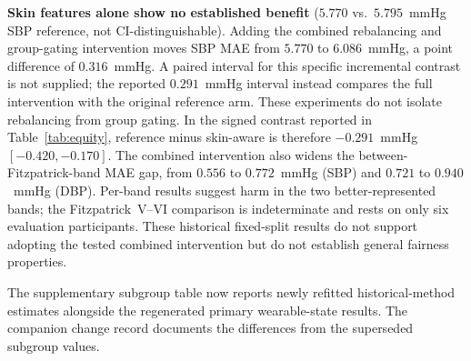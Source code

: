 \documentclass[12pt]{article}
\begin{document}
\textbf{Skin features alone show no established benefit} ($5.770$ vs.\ $5.795$~mmHg SBP reference, not CI-distinguishable). Adding the combined rebalancing and group-gating intervention moves SBP MAE from $5.770$ to $6.086$~mmHg, a point difference of $0.316$~mmHg. A paired interval for this specific incremental contrast is not supplied; the reported $0.291$~mmHg interval instead compares the full intervention with the original reference arm. These experiments do not isolate rebalancing from group gating. In the signed contrast reported in Table~\ref{tab:equity}, reference minus skin-aware is therefore $-0.291$~mmHg $[-0.420,-0.170]$. The combined intervention also widens the between-Fitzpatrick-band MAE gap, from $0.556$ to $0.772$~mmHg (SBP) and $0.721$ to $0.940$~mmHg (DBP). Per-band results suggest harm in the two better-represented bands; the Fitzpatrick~V--VI comparison is indeterminate and rests on only six evaluation participants. These historical fixed-split results do not support adopting the tested combined intervention but do not establish general fairness properties.

The supplementary subgroup table now reports newly refitted historical-method estimates alongside the regenerated primary wearable-state results. The companion change record documents the differences from the superseded subgroup values.
\end{document}
